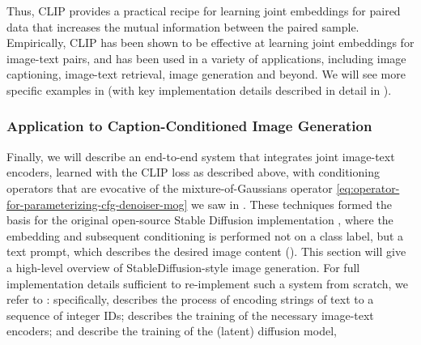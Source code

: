 \documentclass[../../book-main_zh.tex]{subfiles}
\begin{document}
Thus, CLIP provides a practical recipe for learning joint embeddings for paired
data that increases the mutual information between the paired sample.
Empirically, CLIP has been shown to be effective at learning joint embeddings
for image-text pairs, and has been used in a variety of applications, including
image captioning, image-text retrieval, image generation and beyond. We will see
more specific examples in  (with key implementation
details described in detail in ).


\subsubsection{Application to Caption-Conditioned Image Generation}


Finally, we will describe an end-to-end system that integrates joint image-text
encoders, learned with the CLIP loss as described above, with conditioning
operators that are evocative of the mixture-of-Gaussians operator
\eqref{eq:operator-for-parameterizing-cfg-denoiser-mog} we saw in
.
These techniques
formed the basis for the original open-source Stable Diffusion implementation
\cite{rombach2022high},
where the embedding and subsequent conditioning is performed not on
a class label, but a text prompt, which describes the desired image content
().
This section will give a high-level overview of StableDiffusion-style image
generation. For full implementation details sufficient to re-implement such
a system from scratch, we refer to : specifically, 
 describes the process of encoding strings of text to
a sequence of integer IDs;  describes the training of the
necessary image-text encoders; and 
describe the training of the (latent) diffusion model, 
\end{document}
